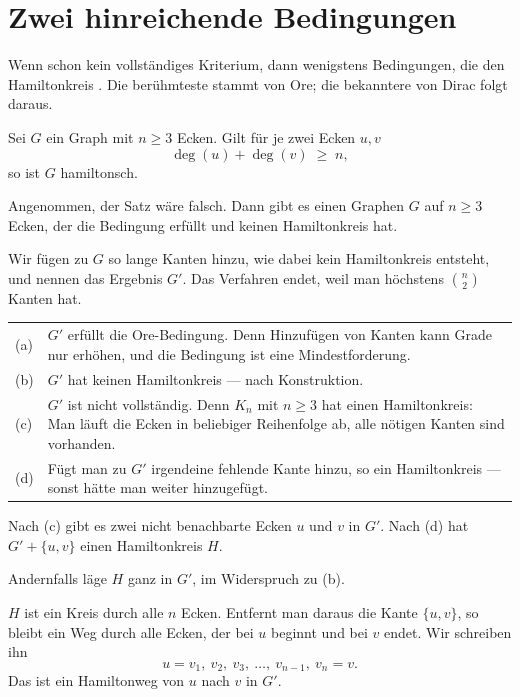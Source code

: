 \section{Zwei hinreichende Bedingungen}

Wenn schon kein vollständiges Kriterium, dann wenigstens Bedingungen, die den Hamiltonkreis . Die berühmteste stammt von Ore; die bekanntere von Dirac folgt daraus.

\begin{merksatz}
Sei $G$ ein Graph mit $n \ge 3$ Ecken. Gilt für je zwei  Ecken $u,v$
\[ \deg(u) + \deg(v) \;\ge\; n , \]
so ist $G$ hamiltonsch.
\end{merksatz}

\begin{merksatz}
Angenommen, der Satz wäre falsch. Dann gibt es einen Graphen $G$ auf $n \ge 3$ Ecken, der die Bedingung erfüllt und keinen Hamiltonkreis hat.

Wir fügen zu $G$ so lange Kanten hinzu, wie dabei kein Hamiltonkreis entsteht, und nennen das Ergebnis $G'$. Das Verfahren endet, weil man höchstens $\binom{n}{2}$ Kanten hat.

\begin{center}
\renewcommand{\arraystretch}{1.5}
\begin{tabular}{@{}P{1.4cm}P{7.0cm}@{}}
\toprule
(a) & $G'$ erfüllt die Ore-Bedingung. Denn Hinzufügen von Kanten kann Grade nur erhöhen, und die Bedingung ist eine Mindestforderung.\\
(b) & $G'$ hat keinen Hamiltonkreis --- nach Konstruktion.\\
(c) & $G'$ ist nicht vollständig. Denn $K_n$ mit $n \ge 3$ hat einen Hamiltonkreis: Man läuft die Ecken in beliebiger Reihenfolge ab, alle nötigen Kanten sind vorhanden.\\
(d) & Fügt man zu $G'$ irgendeine fehlende Kante hinzu, so  ein Hamiltonkreis --- sonst hätte man weiter hinzugefügt.\\
\bottomrule
\end{tabular}
\end{center}
\end{merksatz}

\begin{merksatz}
Nach (c) gibt es zwei nicht benachbarte Ecken $u$ und $v$ in $G'$. Nach (d) hat $G' + \{u,v\}$ einen Hamiltonkreis $H$.

Andernfalls läge $H$ ganz in $G'$, im Widerspruch zu (b).

$H$ ist ein Kreis durch alle $n$ Ecken. Entfernt man daraus die Kante $\{u,v\}$, so bleibt ein Weg durch alle Ecken, der bei $u$ beginnt und bei $v$ endet. Wir schreiben ihn
\[ u = v_1,\ v_2,\ v_3,\ \ldots,\ v_{n-1},\ v_n = v . \]
Das ist ein Hamiltonweg von $u$ nach $v$ in $G'$.
\end{merksatz}

